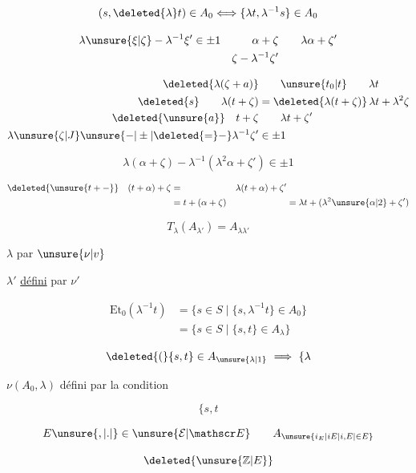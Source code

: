 \[
(s,\deleted{\lambda}t)\in A_0\Longleftrightarrow\{\lambda t,\lambda^{-1}s\}\in A_0
\]

\[
\begin{aligned}
\lambda\unsure{\xi|\zeta}-\lambda^{-1}\xi'&\in\pm1 &\alpha+\zeta&\qquad\lambda\alpha+\zeta'\\
&&\zeta-\lambda^{-1}\zeta'&
\end{aligned}
\]

\[
\begin{aligned}
\deleted{\lambda(\zeta+a)}&\qquad \unsure{t_0|t}\qquad\lambda t\\
\deleted{s}\qquad\lambda(t+\zeta)&=\deleted{\lambda(t+\zeta)}\,\lambda t+\lambda^2\zeta\\
\deleted{\unsure{a}}\quad t+\zeta&\qquad\lambda t+\zeta'\\
\lambda\unsure{\zeta|J}\unsure{-|\pm|\deleted{=}-}\lambda^{-1}\zeta'&\in\pm1
\end{aligned}
\]

\[
\lambda(\alpha+\zeta)-\lambda^{-1}(\lambda^2\alpha+\zeta')\in\pm1
\]

\[
\begin{aligned}
\deleted{\unsure{t+-}}\quad(t+\alpha)+\zeta&=&\lambda(t+\alpha)+\zeta'&\\
&=t+(\alpha+\zeta) & &=\lambda t+(\lambda^2\unsure{\alpha|2}+\zeta')
\end{aligned}
\]


\[
T_\lambda(A_{\lambda'})=A_{\lambda\lambda'}
\]

$\lambda$ \uline{} par $\unsure{\nu|v}$

$\lambda'$ \uline{défini} par $\nu'$

\[
\begin{aligned}
\mathrm{Et}_0(\lambda^{-1}t)&=\{s\in S\mid\{s,\lambda^{-1}t\}\in A_0\}\\
&=\{s\in S\mid\{s,t\}\in A_\lambda\}
\end{aligned}
\]

\[
\deleted{(}\{s,t\}\in A_{\unsure{\lambda|1}}\ \Longrightarrow\ \{\lambda
\]

$\nu(A_0,\lambda)$ défini par la condition

\[
\{s,t
\]

\[
E\unsure{,|.|{}}\in\unsure{\mathcal E|\mathscr E}\qquad A_{\unsure{i_E|iE|i,E|\in E}}
\]

\[
\deleted{\unsure{\mathbb Z|E}}
\]

